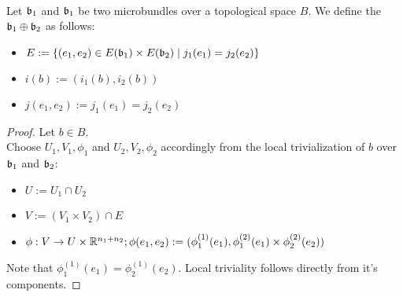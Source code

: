  \\
Let $\mathfrak{b}_1$ and $\mathfrak{b}_1$ be two microbundles over a topological space $B$.
We define the  $\mathfrak{b}_1 \oplus \mathfrak{b}_2$ as follows:
\begin{itemize}
    \item $E := \{ (e_1, e_2) \in E(\mathfrak{b}_1) \times E(\mathfrak{b}_2) \mid j_1(e_1) = j_2(e_2)\}$
    \item $i(b) := (i_1(b), i_2(b))$
    \item $j(e_1, e_2) := j_1(e_1) = j_2(e_2)$
\end{itemize}
\begin{proof}
Let $b \in B$. \\
Choose $U_1, V_1, \phi_1$ and $U_2, V_2, \phi_2$ accordingly from the local trivialization of $b$ over $\mathfrak{b}_1$ and $\mathfrak{b}_2$:
\begin{itemize}
    \item $U := U_1 \cap U_2$
    \item $V := (V_1 \times V_2) \cap E$
    \item $\phi: V \to U \times \mathbb{R}^{n_1 + n_2}; \phi(e_1, e_2) := (\phi_1^{(1)}(e_1), \phi_1^{(2)}(e_1) \times  \phi_2^{(2)}(e_2))$
\end{itemize}
Note that $\phi_1^{(1)}(e_1) = \phi_2^{(1)}(e_2)$.
Local triviality follows directly from it's components.
\end{proof}